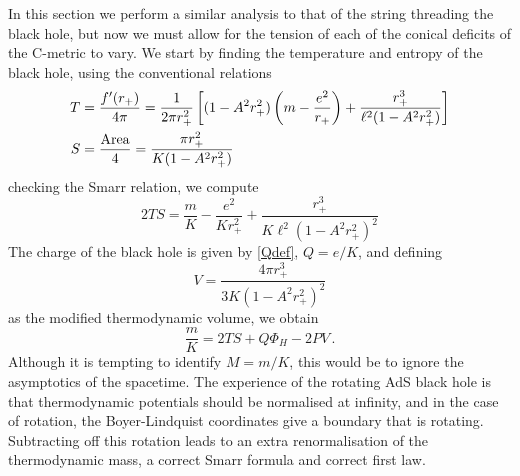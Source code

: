 \documentclass[
twoside,openright,frontopenright]{dmathesis}
\begin{document}
In this section we perform a similar analysis to that of the string threading the 
black hole, but now we must allow for the tension of each of the conical deficits
of the C-metric to vary.
We start by finding the temperature and entropy of the black hole, using
the conventional relations
\begin{equation}
\begin{aligned}
T &= \frac{f'(r_+)}{4\pi} = \frac{1}{2\pi r_+^2} \left [ (1-A^2 r_+^2) \left (
m - \frac{e^2}{r_+}\right) + \frac{r_+^3}{\ell^2(1-A^2 r_+^2)} \right]\\
S &= \frac{\rm Area}{4} =\frac{\pi r_+^2}{K(1-A^2 r_+^2)}
\end{aligned}
\end{equation}
checking the Smarr relation, we compute
\begin{equation}
2TS =\frac{m}{K} - \frac{e^2}{K r_+^2}
+ \frac{r_+^3}{K\ell^2(1-A^2 r_+^2)^2} 
\end{equation}
The charge of the black hole is given by \eqref{Qdef}, $Q = e/K$, and defining 
\begin{equation}
V  = \frac{4\pi r_+^3}{3K(1-A^2r_+^2)^2}
\end{equation}
as the modified thermodynamic volume, we obtain
\begin{equation}
\frac{m}{K} = 2 TS  + Q\Phi_H - 2 PV\,.
\end{equation}
Although it is tempting to identify $M=m/K$, this would be to ignore the
asymptotics of the spacetime. The experience of the rotating AdS black hole
\cite{Gibbons:2004ai} is that thermodynamic potentials should be normalised at
infinity, and in the case of rotation, the Boyer-Lindquist coordinates give a
boundary that is rotating. Subtracting off this rotation leads to an extra
renormalisation of the thermodynamic mass, a correct Smarr formula and correct
first law.
\end{document}
